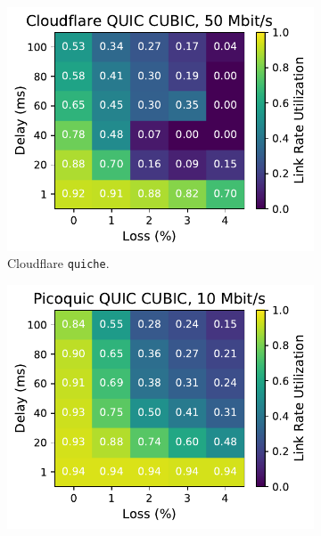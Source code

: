 \begin{figure}[ht]
\begin{subfigure}[b]{0.22\linewidth}
        \includegraphics[width=\linewidth,trim={0 0 2cm 0},clip]{splitting-paper/figures/heatmaps/heatmap_quiche_cubic_50mbps.pdf}
        \caption{Cloudflare \texttt{quiche}.}
    \end{subfigure}
    \begin{subfigure}[b]{0.22\linewidth}
        \includegraphics[width=\linewidth,trim={0 0 2cm 0},clip]{splitting-paper/figures/heatmaps/heatmap_picoquic_cubic_10mbps.pdf}

\end{subfigure}
\end{figure}

